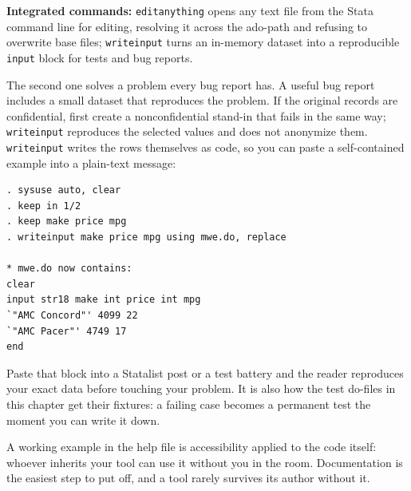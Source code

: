 \begin{kaobox}[frametitle=Package Integration: \texttt{editanything} and \texttt{writeinput}]
\textbf{Integrated commands:} \texttt{editanything} opens any text file from the Stata command line for editing, resolving it across the ado-path and refusing to overwrite base files; \texttt{writeinput} turns an in-memory dataset into a reproducible \texttt{input} block for tests and bug reports.

The second one solves a problem every bug report has. A useful bug report includes a small dataset that reproduces the problem. If the original records are confidential, first create a nonconfidential stand-in that fails in the same way; \texttt{writeinput} reproduces the selected values and does not anonymize them. \texttt{writeinput} writes the rows themselves as code, so you can paste a self-contained example into a plain-text message:
\par
{\footnotesize
\begin{verbatim}
. sysuse auto, clear
. keep in 1/2
. keep make price mpg
. writeinput make price mpg using mwe.do, replace

* mwe.do now contains:
clear
input str18 make int price int mpg
`"AMC Concord"' 4099 22
`"AMC Pacer"' 4749 17
end
\end{verbatim}
}
Paste that block into a Statalist post or a test battery and the reader reproduces your exact data before touching your problem. It is also how the test do-files in this chapter get their fixtures: a failing case becomes a permanent test the moment you can write it down.
\end{kaobox}

A working example in the help file is accessibility applied to the code itself: whoever inherits your tool can use it without you in the room. Documentation is the easiest step to put off, and a tool rarely survives its author without it.

